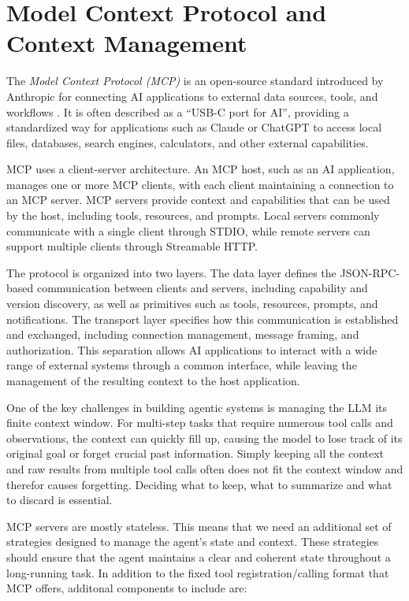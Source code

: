 \section{Model Context Protocol and Context Management}\label{sec:mcp}

The \textit{Model Context Protocol (MCP)} is an open-source standard introduced by Anthropic for connecting AI applications to external data sources, tools, and workflows \citep{xinyi2026mcp}. It is often described as a ``USB-C port for AI'', providing a standardized way for applications such as Claude or ChatGPT to access local files, databases, search engines, calculators, and other external capabilities.

MCP uses a client-server architecture. An MCP host, such as an AI application, manages one or more MCP clients, with each client maintaining a connection to an MCP server. MCP servers provide context and capabilities that can be used by the host, including tools, resources, and prompts. Local servers commonly communicate with a single client through STDIO, while remote servers can support multiple clients through Streamable HTTP.

The protocol is organized into two layers. The data layer defines the JSON-RPC-based communication between clients and servers, including capability and version discovery, as well as primitives such as tools, resources, prompts, and notifications. The transport layer specifies how this communication is established and exchanged, including connection management, message framing, and authorization. This separation allows AI applications to interact with a wide range of external systems through a common interface, while leaving the management of the resulting context to the host application.

One of the key challenges in building agentic systems is managing the LLM its finite context window. For multi-step tasks that require numerous tool calls and observations, the context can quickly fill up, causing the model to lose track of its original goal or forget crucial past information. Simply keeping all the context and raw results from multiple tool calls often does not fit the context window and therefor causes forgetting. Deciding what to keep, what to summarize and what to discard is essential.

MCP servers are mostly stateless. This means that we need an additional set of strategies designed to manage the agent's state and context. These strategies should ensure that the agent maintains a clear and coherent state throughout a long-running task. In addition  to the fixed tool registration/calling format that MCP offers, additonal components to include are:


